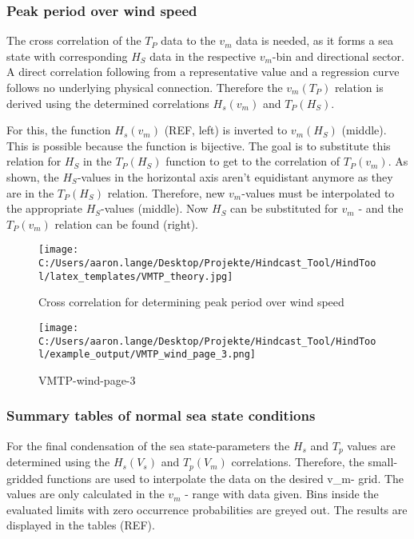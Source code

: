 \subsubsection{Peak period over wind speed }
The cross correlation of the $T_{P}$ data to the $v_{m}$ data is needed, as it forms a sea state with corresponding $H_{S}$ data in the respective $v_{m}$-bin and directional sector. A direct correlation following from a representative value and a regression curve follows no underlying physical connection. Therefore the $v_{m}\left(T_{P}\right)$ relation is derived using the determined correlations $H_{s}\left(v_{m}\right)$ and $T_{P}\left(H_{S}\right)$.

For this, the function $H_{s}\left(v_{m}\right)$ (REF, left) is inverted to $v_{m}\left(H_{S}\right)$ (middle). This is possible because the function is bijective. The goal is to substitute this relation for $H_{S}$ in the $T_{P}\left(H_{S}\right)$ function to get to the correlation of $T_{P}\left(v_{m}\right)$. As shown, the $H_{S}$-values in the horizontal axis aren't equidistant anymore as they are in the $T_{P}\left(H_{S}\right)$ relation. Therefore, new $v_{m}$-values must be interpolated to the appropriate $H_{S}$-values (middle). Now $H_{S}$ can be substituted for $v_{m}$ - and the $T_{P}\left(v_{m}\right)$ relation can be found (right).\\

\begin{figure}[H] 
 \centering 
 \texttt{[image: C:/Users/aaron.lange/Desktop/Projekte/Hindcast\_Tool/HindTool/latex\_templates/VMTP\_theory.jpg]} 
 \caption{ Cross correlation for determining peak period over wind speed } 
 \label{fig: VMTP_theory } 
\end{figure}
\begin{figure}[H] 
 \centering 
 \texttt{[image: C:/Users/aaron.lange/Desktop/Projekte/Hindcast\_Tool/HindTool/example\_output/VMTP\_wind\_page\_3.png]} 
 \caption{ VMTP-wind-page-3 } 
 \label{fig: VMTP_wind_page_3 } 
\end{figure}

\subsubsection{Summary tables of normal sea state conditions}
For the final condensation of the sea state-parameters the $H_s$ and $T_p$ values are determined using the $H_s(V_s)$ and $T_p(V_m)$ correlations. Therefore, the small-gridded functions are used to interpolate the data on the desired v_m- grid. The values are only calculated in the $v_m$ - range with data given. Bins inside the evaluated limits with zero occurrence probabilities are greyed out. The results are displayed in the tables (REF).

